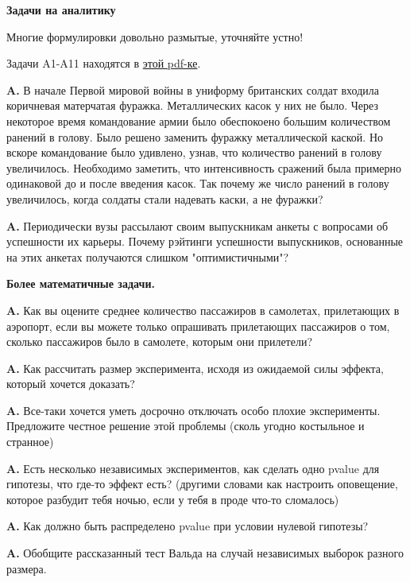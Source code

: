 \documentclass[12pt,a4paper]{article}
\newcounter{znum}
\newcommand{\z}[1]{\addtocounter{znum}{1} \textbf{A\arabic{znum}#1. }}
\renewcommand{\!}{\textcolor{red}{!}}
\begin{document}
	
\thispagestyle{empty}
\begin{center}
	\large
	\textbf{Задачи на аналитику}
	\normalsize
\end{center}



Многие формулировки довольно размытые, уточняйте устно!

Задачи A1-A11 находятся в \href{https://github.com/Andrew-Angrew/lesh_2019_applied_statistics/blob/master/materials/Nauka_i_zhizn.pdf}{этой pdf-ке}.



\z{} В начале Первой мировой войны в униформу британских солдат входила коричневая матерчатая фуражка. Металлических касок у них не было. Через некоторое время командование армии было обеспокоено большим количеством ранений в голову. Было решено заменить фуражку металлической каской. Но вскоре командование было удивлено, узнав, что количество ранений в голову увеличилось. Необходимо заметить, что интенсивность сражений была примерно одинаковой до и после введения касок. Так почему же число ранений в голову увеличилось, когда солдаты стали надевать каски, а не фуражки?

\z{} Периодически вузы рассылают своим выпускникам анкеты с вопросами об успешности их карьеры. Почему рэйтинги успешности выпускников, основанные на этих анкетах получаются слишком "оптимистичными"?

\begin{center}
	\textbf{Более математичные задачи.}
\end{center}

\z{} Как вы оцените среднее количество пассажиров в самолетах, прилетающих в аэропорт, если вы можете только опрашивать прилетающих пассажиров о том, сколько пассажиров было в самолете, которым они прилетели?

\z{} Как рассчитать размер эксперимента, исходя из ожидаемой силы эффекта, который хочется доказать?

\z{} Все-таки хочется уметь досрочно отключать особо плохие эксперименты. Предложите честное решение этой проблемы (сколь угодно костыльное и странное)

\z{} Есть несколько независимых экспериментов, как сделать одно pvalue для гипотезы, что где-то эффект есть? (другими словами как настроить оповещение, которое разбудит тебя ночью, если у тебя в проде что-то сломалось)

\z{} Как должно быть распределено pvalue при условии нулевой гипотезы?

\z{} Обобщите рассказанный тест Вальда на случай независимых выборок разного размера.
\end{document}
